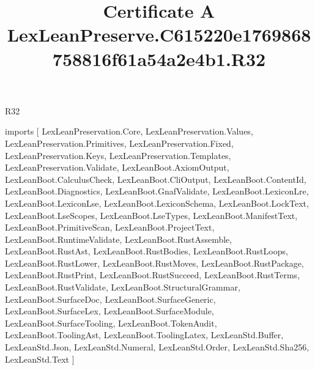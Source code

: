\begin{lexlean}{R32}
\title{Certificate A LexLeanPreserve.C615220e1769868758816f61a54a2e4b1.R32}
\begin{coremodule}
imports [
  LexLeanPreservation.Core,
  LexLeanPreservation.Values,
  LexLeanPreservation.Primitives,
  LexLeanPreservation.Fixed,
  LexLeanPreservation.Keys,
  LexLeanPreservation.Templates,
  LexLeanPreservation.Validate,
  LexLeanBoot.AxiomOutput,
  LexLeanBoot.CalculusCheck,
  LexLeanBoot.CliOutput,
  LexLeanBoot.ContentId,
  LexLeanBoot.Diagnostics,
  LexLeanBoot.GnafValidate,
  LexLeanBoot.LexiconLre,
  LexLeanBoot.LexiconLse,
  LexLeanBoot.LexiconSchema,
  LexLeanBoot.LockText,
  LexLeanBoot.LseScopes,
  LexLeanBoot.LseTypes,
  LexLeanBoot.ManifestText,
  LexLeanBoot.PrimitiveScan,
  LexLeanBoot.ProjectText,
  LexLeanBoot.RuntimeValidate,
  LexLeanBoot.RustAssemble,
  LexLeanBoot.RustAst,
  LexLeanBoot.RustBodies,
  LexLeanBoot.RustLoops,
  LexLeanBoot.RustLower,
  LexLeanBoot.RustMoves,
  LexLeanBoot.RustPackage,
  LexLeanBoot.RustPrint,
  LexLeanBoot.RustSucceed,
  LexLeanBoot.RustTerms,
  LexLeanBoot.RustValidate,
  LexLeanBoot.StructuralGrammar,
  LexLeanBoot.SurfaceDoc,
  LexLeanBoot.SurfaceGeneric,
  LexLeanBoot.SurfaceLex,
  LexLeanBoot.SurfaceModule,
  LexLeanBoot.SurfaceTooling,
  LexLeanBoot.TokenAudit,
  LexLeanBoot.ToolingAst,
  LexLeanBoot.ToolingLatex,
  LexLeanStd.Buffer,
  LexLeanStd.Json,
  LexLeanStd.Numeral,
  LexLeanStd.Order,
  LexLeanStd.Sha256,
  LexLeanStd.Text
]


\end{coremodule}
\end{lexlean}
